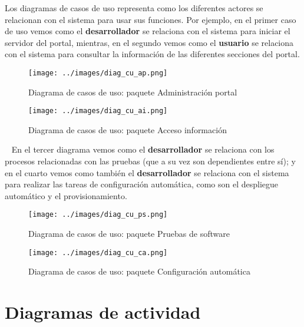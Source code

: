 Los diagramas de casos de uso representa como los diferentes actores se relacionan con el sistema para usar sus funciones. Por ejemplo, en el primer caso de uso vemos como el \textbf{desarrollador} se relaciona con el sistema para iniciar el servidor del portal, mientras, en el segundo vemos como el \textbf{usuario} se relaciona con el sistema para consultar la información de las diferentes secciones del portal.

\begin{figure}[!ht]
  \begin{center}
  \texttt{[image: ../images/diag\_cu\_ap.png]}
  \caption{Diagrama de casos de uso: paquete Administración portal}
  \label{fig:diag_cu_ap}
  \end{center}
\end{figure}

\begin{figure}[!ht]
  \begin{center}
  \texttt{[image: ../images/diag\_cu\_ai.png]}
  \caption{Diagrama de casos de uso: paquete Acceso información}
  \label{fig:diag_cu_ai}
  \end{center}
\end{figure}

\newpage
\
\newpage
En el tercer diagrama vemos como el \textbf{desarrollador} se relaciona con los procesos relacionadas con las pruebas (que a su vez son dependientes entre sí); y en el cuarto vemos como también el \textbf{desarrollador} se relaciona con el sistema para realizar las tareas de configuración automática, como son el despliegue automático y el provisionamiento.

\begin{figure}[!ht]
  \begin{center}
  \texttt{[image: ../images/diag\_cu\_ps.png]}
  \caption{Diagrama de casos de uso: paquete Pruebas de software}
  \label{fig:diag_cu_ps}
  \end{center}
\end{figure}

\begin{figure}[!ht]
  \begin{center}
  \texttt{[image: ../images/diag\_cu\_ca.png]}
  \caption{Diagrama de casos de uso: paquete Configuración automática}
  \label{fig:diag_cu_ca}
  \end{center}
\end{figure}

\newpage
\section{Diagramas de actividad}

